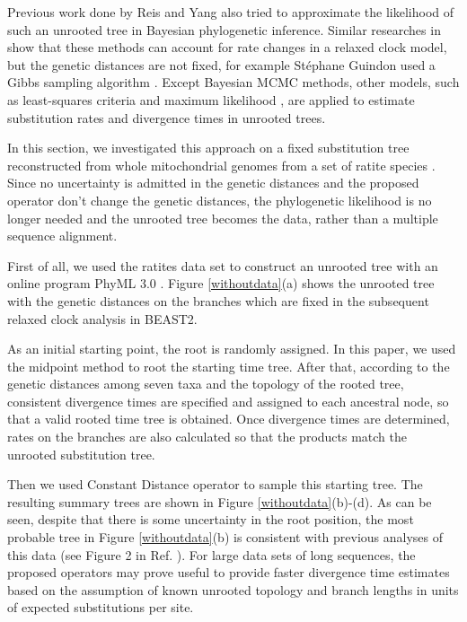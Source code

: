 \documentclass{bmcart}
\begin{document}
Previous work done by Reis and Yang \cite{reis2011approximate} also tried to approximate the likelihood of such an unrooted tree in Bayesian phylogenetic inference. Similar researches in \cite{thorne1998estimating,guindon2010bayesian} show that these methods can account for rate changes in a relaxed clock model, but the genetic distances are not fixed, for example St{\'e}phane Guindon used a Gibbs sampling algorithm \cite{guindon2010bayesian}. Except Bayesian MCMC methods, other models, such as least-squares criteria \cite{to2015fast} and maximum likelihood \cite{sagulenko2018treetime,sanderson2003r8s}, are applied to estimate substitution rates and divergence times in unrooted trees. 

In this section, we investigated this approach on a fixed substitution tree reconstructed from whole mitochondrial genomes from a set of ratite species \cite{cooper2001complete}. Since no uncertainty is admitted in the genetic distances and the proposed operator don't change the genetic distances, the phylogenetic likelihood is no longer needed and the unrooted tree becomes the data, rather than a multiple sequence alignment.

First of all, we used the ratites data set to construct an unrooted tree with an online program PhyML 3.0 \cite{phyml,guindon2010new}.  Figure \ref{withoutdata}(a) shows the unrooted tree with the genetic distances on the branches which are fixed in the subsequent relaxed clock analysis in BEAST2.

As an initial starting point, the root is randomly assigned. In this paper, we used the midpoint method to root the starting time tree. After that, according to the genetic distances among seven taxa and the topology of the rooted tree, consistent divergence times are specified and assigned to each ancestral node, so that a valid rooted time tree is obtained. Once divergence times are determined, rates on the branches are also calculated so that the products match the unrooted substitution tree.

Then we used Constant Distance operator to sample this starting tree. The resulting summary trees are shown in Figure \ref{withoutdata}(b)-(d). As can be seen, despite that there is some uncertainty in the root position, the most probable tree in Figure \ref{withoutdata}(b) is consistent with previous analyses of this data (see Figure 2 in Ref. \cite{cooper2001complete}). For large data sets of long sequences, the proposed operators may prove useful to provide faster divergence time estimates based on the assumption of known unrooted topology and branch lengths in units of expected substitutions per site.
\end{document}
